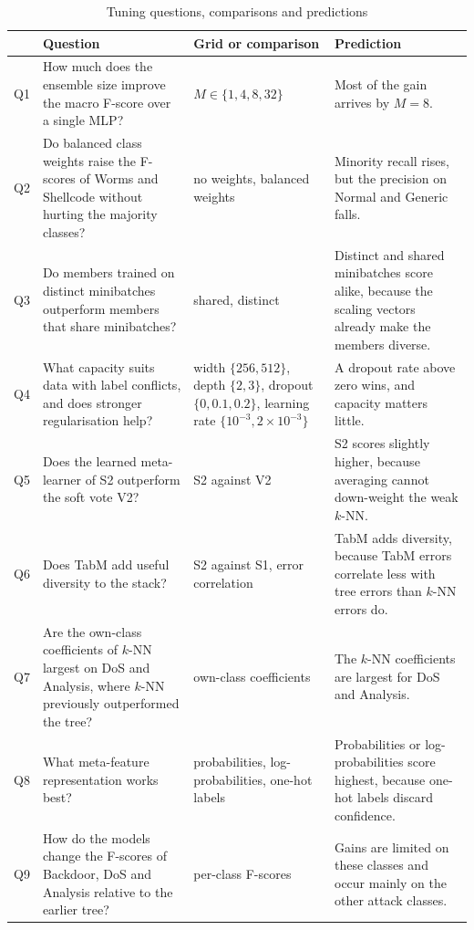 \documentclass[conference]{IEEEtran}
\newcommand{\knn}{\mbox{$k$-NN}}
\begin{document}
\begin{table}[!t]
    \caption{Tuning questions, comparisons and predictions}
    \label{tab:questions}
    \centering\footnotesize
    \begin{tabular}{@{}l>{\raggedright}p{6.2cm}>{\raggedright}p{4.6cm}>{\raggedright\arraybackslash}p{5.2cm}@{}}
        \toprule
        & Question & Grid or comparison & Prediction \\
        \midrule
        Q1 & How much does the ensemble size improve the macro F-score over a single MLP? & $M \in \{1, 4, 8, 32\}$ & Most of the gain arrives by $M = 8$. \\
        Q2 & Do balanced class weights raise the F-scores of Worms and Shellcode without hurting the majority classes? & no weights, balanced weights & Minority recall rises, but the precision on Normal and Generic falls. \\
        Q3 & Do members trained on distinct minibatches outperform members that share minibatches? & shared, distinct & Distinct and shared minibatches score alike, because the scaling vectors already make the members diverse. \\
        Q4 & What capacity suits data with label conflicts, and does stronger regularisation help? & width $\{256, 512\}$, depth $\{2, 3\}$, dropout $\{0, 0.1, 0.2\}$, learning rate $\{10^{-3}, 2\times10^{-3}\}$ & A dropout rate above zero wins, and capacity matters little. \\
        Q5 & Does the learned meta-learner of S2 outperform the soft vote V2? & S2 against V2 & S2 scores slightly higher, because averaging cannot down-weight the weak \knn{}. \\
        Q6 & Does TabM add useful diversity to the stack? & S2 against S1, error correlation & TabM adds diversity, because TabM errors correlate less with tree errors than \knn{} errors do. \\
        Q7 & Are the own-class coefficients of \knn{} largest on DoS and Analysis, where \knn{} previously outperformed the tree? & own-class coefficients & The \knn{} coefficients are largest for DoS and Analysis. \\
        Q8 & What meta-feature representation works best? & probabilities, log-probabilities, one-hot labels & Probabilities or log-probabilities score highest, because one-hot labels discard confidence. \\
        Q9 & How do the models change the F-scores of Backdoor, DoS and Analysis relative to the earlier tree? & per-class F-scores & Gains are limited on these classes and occur mainly on the other attack classes. \\
        \bottomrule
    \end{tabular}
\end{table}
\end{document}
